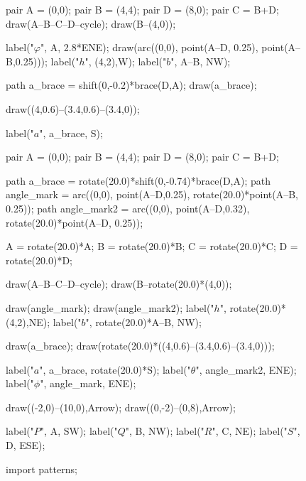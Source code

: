 \documentclass[../key.tex]{subfiles}
\begin{document}
\begin{figure}[h]
	\begin{center}
		\begin{minipage}[b]{0.3\textwidth}
			\centering
			\begin{asy}[width=0.9\textwidth]
				pair A = (0,0);
				pair B = (4,4);
				pair D = (8,0);
				pair C = B+D;
				draw(A--B--C--D--cycle);
				draw(B--(4,0));

				label("$\varphi$", A, 2.8*ENE);
				draw(arc((0,0), point(A--D, 0.25), point(A--B,0.25)));
				label("$h$", (4,2),W);
				label("$b$", A--B, NW);

				path a_brace = shift(0,-0.2)*brace(D,A);
				draw(a_brace);

				draw((4,0.6)--(3.4,0.6)--(3.4,0));

				label("$a$", a_brace, S);
			\end{asy}
		\end{minipage}
		\hfill
		\begin{minipage}[b]{0.3\textwidth}
			\centering
			\begin{asy}[width=0.7\textwidth]
				pair A = (0,0);
				pair B = (4,4);
				pair D = (8,0);
				pair C = B+D;

				path a_brace = rotate(20.0)*shift(0,-0.74)*brace(D,A);
				path angle_mark = arc((0,0), point(A--D,0.25), rotate(20.0)*point(A--B, 0.25));
				path angle_mark2 = arc((0,0), point(A--D,0.32), rotate(20.0)*point(A--D, 0.25));

				A = rotate(20.0)*A;
				B = rotate(20.0)*B;
				C = rotate(20.0)*C;
				D = rotate(20.0)*D;

				draw(A--B--C--D--cycle);
				draw(B--rotate(20.0)*(4,0));

				draw(angle_mark);
				draw(angle_mark2);
				label("$h$", rotate(20.0)*(4,2),NE);
				label("$b$", rotate(20.0)*A--B, NW);

				draw(a_brace);
				draw(rotate(20.0)*((4,0.6)--(3.4,0.6)--(3.4,0)));

				label("$a$", a_brace, rotate(20.0)*S);
				label("$\theta$", angle_mark2, ENE);
				label("$\phi$", angle_mark, ENE);

				draw((-2,0)--(10,0),Arrow);
				draw((0,-2)--(0,8),Arrow);

				label("$P$", A, SW);
				label("$Q$", B, NW);
				label("$R$", C, NE);
				label("$S$", D, ESE);
			\end{asy}
		\end{minipage}
		\hfill
		\begin{minipage}[b]{0.3\textwidth}
			\centering
			\begin{asy}[width=0.9\textwidth]
				import patterns;


\end{asy}
\end{minipage}
\end{center}
\end{figure}
\end{document}
